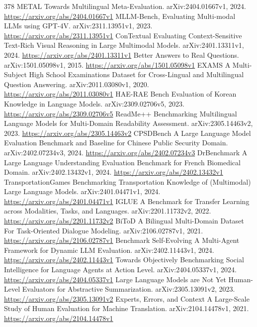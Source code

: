 \documentclass[11pt]{article}
\begin{document}
\begin{thebibliography}{378}
 METAL Towards Multilingual Meta-Evaluation. arXiv:2404.01667v1, 2024. \url{https://arxiv.org/abs/2404.01667v1}
 MLLM-Bench, Evaluating Multi-modal LLMs using GPT-4V. arXiv:2311.13951v1, 2023. \url{https://arxiv.org/abs/2311.13951v1}
 ConTextual Evaluating Context-Sensitive Text-Rich Visual Reasoning in Large Multimodal Models. arXiv:2401.13311v1, 2024. \url{https://arxiv.org/abs/2401.13311v1}
 Better Answers to Real Questions. arXiv:1501.05098v1, 2015. \url{https://arxiv.org/abs/1501.05098v1}
 EXAMS A Multi-Subject High School Examinations Dataset for Cross-Lingual and Multilingual Question Answering. arXiv:2011.03080v1, 2020. \url{https://arxiv.org/abs/2011.03080v1}
 HAE-RAE Bench Evaluation of Korean Knowledge in Language Models. arXiv:2309.02706v5, 2023. \url{https://arxiv.org/abs/2309.02706v5}
 ReadMe++ Benchmarking Multilingual Language Models for Multi-Domain Readability Assessment. arXiv:2305.14463v2, 2023. \url{https://arxiv.org/abs/2305.14463v2}
 CPSDBench A Large Language Model Evaluation Benchmark and Baseline for Chinese Public Security Domain. arXiv:2402.07234v3, 2024. \url{https://arxiv.org/abs/2402.07234v3}
 DrBenchmark A Large Language Understanding Evaluation Benchmark for French Biomedical Domain. arXiv:2402.13432v1, 2024. \url{https://arxiv.org/abs/2402.13432v1}
 TransportationGames Benchmarking Transportation Knowledge of (Multimodal) Large Language Models. arXiv:2401.04471v1, 2024. \url{https://arxiv.org/abs/2401.04471v1}
 IGLUE A Benchmark for Transfer Learning across Modalities, Tasks, and Languages. arXiv:2201.11732v2, 2022. \url{https://arxiv.org/abs/2201.11732v2}
 BiToD A Bilingual Multi-Domain Dataset For Task-Oriented Dialogue Modeling. arXiv:2106.02787v1, 2021. \url{https://arxiv.org/abs/2106.02787v1}
 Benchmark Self-Evolving A Multi-Agent Framework for Dynamic LLM Evaluation. arXiv:2402.11443v1, 2024. \url{https://arxiv.org/abs/2402.11443v1}
 Towards Objectively Benchmarking Social Intelligence for Language Agents at Action Level. arXiv:2404.05337v1, 2024. \url{https://arxiv.org/abs/2404.05337v1}
 Large Language Models are Not Yet Human-Level Evaluators for Abstractive Summarization. arXiv:2305.13091v2, 2023. \url{https://arxiv.org/abs/2305.13091v2}
 Experts, Errors, and Context A Large-Scale Study of Human Evaluation for Machine Translation. arXiv:2104.14478v1, 2021. \url{https://arxiv.org/abs/2104.14478v1}

\end{thebibliography}
\end{document}

